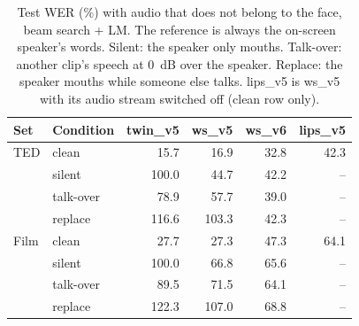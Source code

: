 \begin{table}[t]
\caption{Test WER (\%) with audio that does not belong to the face, beam search + LM. The
reference is always the on-screen speaker's words. Silent: the speaker only mouths. Talk-over:
another clip's speech at 0~dB over the speaker. Replace: the speaker mouths while someone else
talks. lips\_v5 is ws\_v5 with its audio stream switched off (clean row only).}
\label{tab:wrongaudio}
\centering
\setlength{\tabcolsep}{3.5pt}
\begin{tabular}{llrrrr}
\toprule
Set & Condition & twin\_v5 & ws\_v5 & ws\_v6 & lips\_v5 \\
\midrule
TED  & clean     & 15.7  & 16.9  & 32.8 & 42.3 \\
     & silent    & 100.0 & 44.7  & 42.2 & -- \\
     & talk-over & 78.9  & 57.7  & 39.0 & -- \\
     & replace   & 116.6 & 103.3 & 42.3 & -- \\
\midrule
Film & clean     & 27.7  & 27.3  & 47.3 & 64.1 \\
     & silent    & 100.0 & 66.8  & 65.6 & -- \\
     & talk-over & 89.5  & 71.5  & 64.1 & -- \\
     & replace   & 122.3 & 107.0 & 68.8 & -- \\
\bottomrule
\end{tabular}
\end{table}
